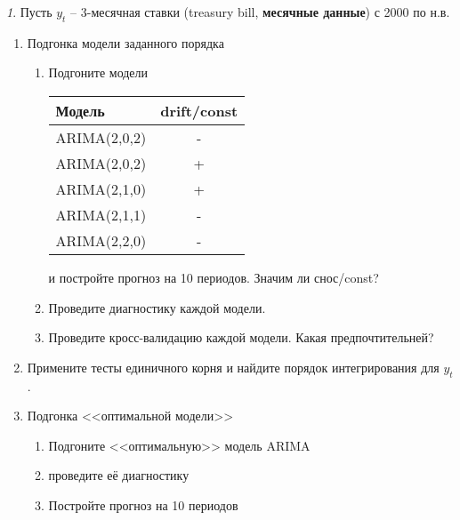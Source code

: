\documentclass[12pt]{article}
\theoremstyle{remark}
\newtheorem{exercise}{}[subsection]
\begin{document}
\begin{exercise}
Пусть \(y_t\) -- 3-месячная ставки (treasury bill, \textbf{месячные данные}) с 2000 по н.в.
\begin{enumerate}
	\item Подгонка модели заданного порядка
	\begin{enumerate}
		\item Подгоните модели
		\begin{center}
		\begin{tabular}{l|c}
			Модель & drift/const \\ \hline
			ARIMA(2,0,2) & - \\
			ARIMA(2,0,2) & + \\
			ARIMA(2,1,0) & + \\
			ARIMA(2,1,1) & - \\
			ARIMA(2,2,0) & - \\ \hline
		\end{tabular}
		\end{center} 
		и постройте прогноз на 10 периодов. Значим ли снос/const?
		\item Проведите диагностику каждой модели.
		\item Проведите кросс-валидацию каждой модели. Какая предпочтительней?
	\end{enumerate}
	\item Примените тесты единичного корня и найдите порядок интегрирования для \(y_t\). 
	\item Подгонка <<оптимальной модели>>
	\begin{enumerate}
		\item Подгоните <<оптимальную>> модель ARIMA
		\item проведите её диагностику
		\item Постройте прогноз на 10 периодов
	\end{enumerate}
\end{enumerate}
\end{exercise}
	
\end{document}
